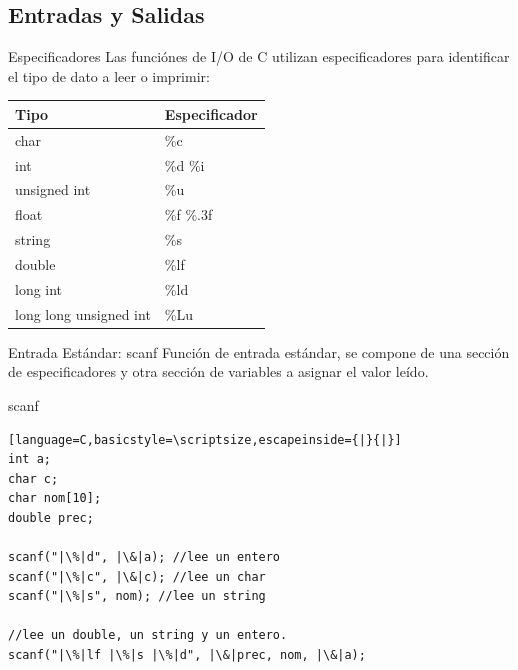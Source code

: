 \documentclass{beamer}
\begin{document}
\subsection{Entradas y Salidas}

\begin{frame}{Especificadores}
Las funciónes de I/O de C utilizan especificadores para identificar el tipo de dato a leer o imprimir:

\begin{center}
	\small
	\begin{tabular}{|l|l|}\hline \hline
	Tipo & Especificador\\ \hline
	char & \%c \\\hline
	int & \%d \hspace{0.3cm} \%i \\\hline
	unsigned int & \%u \\\hline 
	float & \%f \hspace{0.2cm} \%.3f \\\hline
	string & \%s \\\hline
	double & \%lf \\\hline
	long int & \%ld \\\hline
	long long unsigned int & \%Lu \\\hline
	\end{tabular}
\end{center}
\end{frame}

\begin{frame}[fragile]{Entrada Estándar: scanf}
Función de entrada estándar,  se compone de una sección de especificadores y otra sección de variables a asignar el valor leído.

\begin{exampleblock}{scanf}
\begin{lstlisting}[language=C,basicstyle=\scriptsize,escapeinside={|}{|}]
int a;
char c;
char nom[10];
double prec;

scanf("|\%|d", |\&|a); //lee un entero
scanf("|\%|c", |\&|c); //lee un char
scanf("|\%|s", nom); //lee un string

//lee un double, un string y un entero.
scanf("|\%|lf |\%|s |\%|d", |\&|prec, nom, |\&|a); 
\end{lstlisting}
\end{exampleblock}
\end{frame}
\end{document}
